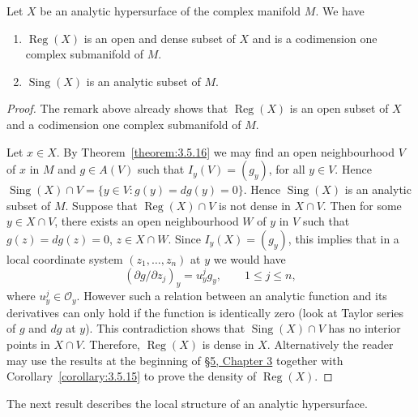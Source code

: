  Let $X$ be an analytic hypersurface of the complex manifold $M$. We have
\begin{enumerate}
\item $\operatorname{Reg}(X)$ is an open and dense subset of $X$ and is a codimension one complex submanifold of $M$.
\item $\operatorname{Sing}(X)$ is an analytic subset of $M$.
\end{enumerate}
\begin{proof}
The remark above already shows that $\operatorname{Reg}(X)$ is an open subset of $X$ and a codimension one complex submanifold of $M$.

Let $x\in X$. By Theorem~\ref{theorem:3.5.16} we may find an open neighbourhood $V$ of $x$ in $M$ and $g\in A(V)$ such that $I_y(V)=(g_y)$, for all $y\in V$. Hence $\operatorname{Sing}(X)\cap V=\{y\in V:g(y)=dg(y)=0\}$. Hence $\operatorname{Sing}(X)$ is an analytic subset of $M$. Suppose that $\operatorname{Reg}(X)\cap V$ is not dense in $X\cap V$. Then for some $y\in X\cap V$, there exists an open neighbourhood $W$ of $y$ in $V$ such that $g(z)=dg(z)=0$, $z\in X\cap W$. Since $I_y(X)=(g_y)$, this implies that in a local coordinate system $(z_1,\ldots,z_n)$ at $y$ we would have
\[
(\partial g/\partial z_j)_y=u_y^jg_y,\qquad1\leq j\leq n,
\]
where $u_y^j\in\mathcal O_y$. However such a relation between an analytic function and its derivatives can only hold if the function is identically zero (look at Taylor series of $g$ and $dg$ at $y$). This contradiction shows that $\operatorname{Sing}(X)\cap V$ has no interior points in $X\cap V$. Therefore, $\operatorname{Reg}(X)$ is dense in $X$. Alternatively the reader may use the results at the beginning of \hyperref[sec:3:5]{\S5, Chapter 3} together with Corollary~\ref{corollary:3.5.15} to prove the density of $\operatorname{Reg}(X)$.
\end{proof}

The next result describes the local structure of an analytic hypersurface.

